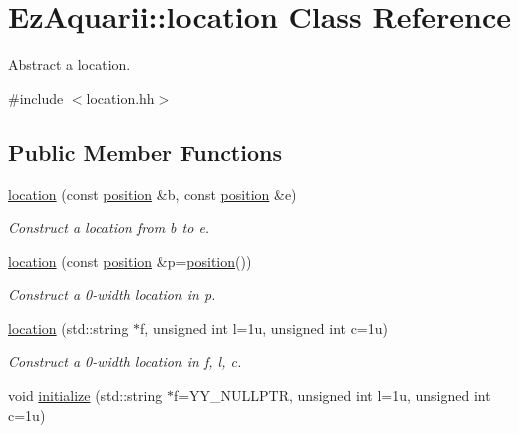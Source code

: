 \hypertarget{classEzAquarii_1_1location}{}\section{Ez\+Aquarii\+:\+:location Class Reference}
\label{classEzAquarii_1_1location}


Abstract a location.  




{\ttfamily \#include $<$location.\+hh$>$}

\subsection*{Public Member Functions}
\begin{DoxyCompactItemize}
\item 
\hyperlink{classEzAquarii_1_1location_ad1317d935037a54e328f1b540d296e76}{location} (const \hyperlink{classEzAquarii_1_1position}{position} \&b, const \hyperlink{classEzAquarii_1_1position}{position} \&e)\hypertarget{classEzAquarii_1_1location_ad1317d935037a54e328f1b540d296e76}{}\label{classEzAquarii_1_1location_ad1317d935037a54e328f1b540d296e76}

\begin{DoxyCompactList}\small\item\em Construct a location from {\itshape b} to {\itshape e}. \end{DoxyCompactList}\item 
\hyperlink{classEzAquarii_1_1location_a53601244b738c831abb3a4fa6b6879a9}{location} (const \hyperlink{classEzAquarii_1_1position}{position} \&p=\hyperlink{classEzAquarii_1_1position}{position}())\hypertarget{classEzAquarii_1_1location_a53601244b738c831abb3a4fa6b6879a9}{}\label{classEzAquarii_1_1location_a53601244b738c831abb3a4fa6b6879a9}

\begin{DoxyCompactList}\small\item\em Construct a 0-\/width location in {\itshape p}. \end{DoxyCompactList}\item 
\hyperlink{classEzAquarii_1_1location_a0c8659136500d18d4b2bca8077074c5b}{location} (std\+::string $\ast$f, unsigned int l=1u, unsigned int c=1u)\hypertarget{classEzAquarii_1_1location_a0c8659136500d18d4b2bca8077074c5b}{}\label{classEzAquarii_1_1location_a0c8659136500d18d4b2bca8077074c5b}

\begin{DoxyCompactList}\small\item\em Construct a 0-\/width location in {\itshape f}, {\itshape l}, {\itshape c}. \end{DoxyCompactList}\item 
void \hyperlink{classEzAquarii_1_1location_ab7e7119497ff53c35cf63c5589c598e6}{initialize} (std\+::string $\ast$f=Y\+Y\+\_\+\+N\+U\+L\+L\+P\+TR, unsigned int l=1u, unsigned int c=1u)\hypertarget{classEzAquarii_1_1location_ab7e7119497ff53c35cf63c5589c598e6}{}\label{classEzAquarii_1_1location_ab7e7119497ff53c35cf63c5589c598e6}


\end{DoxyCompactItemize}
